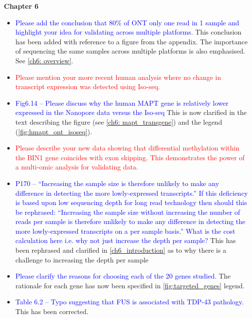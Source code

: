 \documentclass[a4paper,12pt,oneside]{report}
\begin{document}
\vspace{1cm}
\textbf{Chapter 6}
\begin{itemize}
	\item \textcolor{blue}{Please add the conclusion that 80\% of ONT only one read in 1 sample and highlight your idea for validating across multiple platforms.}
	\newline This conclusion has been added with reference to a figure from the appendix. The importance of sequencing the same samples across multiple platforms is also emphasised. See \cref{ch6: overview}.
	\item \textcolor{red}{Please mention your more recent human analysis where no change in transcript expression was detected using Iso-seq.}
	\item \textcolor{blue}{Fig6.14 – Please discuss why the human MAPT gene is relatively lower expressed in the Nanopore data versus the Iso-seq}
	\newline This is now clarified in the text describing the figure (see \cref{ch6: mapt_transgene}) and the legend (\cref{fig:hmapt_ont_isoseq}).
	\item \textcolor{red}{Please describe your new data showing that differential methylation within the BIN1 gene coincides with exon skipping. This demonstrates the power of a multi-omic analysis for validating data.}
	\item \textcolor{blue}{P170 – “Increasing the sample size is therefore unlikely to make any difference in detecting the more lowly-expressed transcripts.” If this deficiency is based upon low sequencing depth for long read technology then should this be rephrased: “Increasing the sample size without increasing the number of reads per sample is therefore unlikely to make any difference in detecting the more lowly-expressed transcripts on a per sample basis.” What is the cost calculation here i.e. why not just increase the depth per sample?} 
	\newline This has been rephrased and clarified in \cref{ch6_introduction} as to why there is a challenge to increasing the depth per sample
	\item \textcolor{blue}{Please clarify the reasons for choosing each of the 20 genes studied.}
	\newline The rationale for each gene has now been specified in \cref{fig:targeted_genes} legend.
	\item \textcolor{blue}{Table 6.2 – Typo suggesting that FUS is associated with TDP-43 pathology}. 
	\newline This has been corrected. 

\end{itemize}
\end{document}
